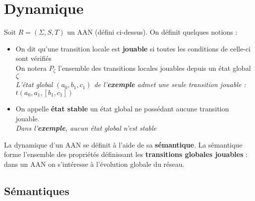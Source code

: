 \documentclass[12pt,a4paper]{article}
\begin{document}
\section{Dynamique}
Soit $R = (\Sigma,S,T)$ un AAN (défini ci-dessus). On définit quelques notions :
\begin{itemize}
	\item On dit qu'une transition locale est \textbf{jouable} si toutes les conditions de celle-ci sont vérifiés\\
	On notera $P_{\zeta}$ l'ensemble des transitions locales jouables depuis un état global $\zeta$\\
	\emph{L'état global $(a_0,b_1,c_1)$ de l'\textbf{exemple} admet une seule transition jouable : $t(a_0,a_1,[b_1,c_1])$}
	\item On appelle \textbf{état stable} un état global ne possédant aucune transition jouable.\\
	\emph{Dans l'\textbf{exemple}, aucun état global n'est stable}
\end{itemize}
La dynamique d'un AAN se définit à l'aide de sa \textbf{sémantique}. La sémantique forme l'ensemble des propriétés définissant les \textbf{transitions globales jouables} : dans un AAN on s'intéresse à l'évolution globale du réseau.
\subsection{Sémantiques}
\end{document}
